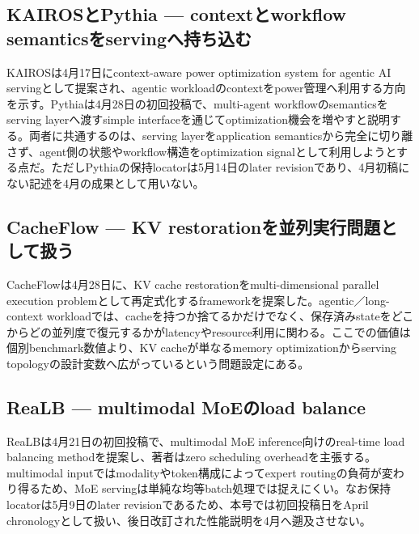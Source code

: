 \begingroup\raggedright
\subsection{KAIROSとPythia — contextとworkflow semanticsをservingへ持ち込む}
\par\endgroup

KAIROSは4月17日にcontext-aware power optimization system for agentic AI servingとして提案され、agentic workloadのcontextをpower管理へ利用する方向を示す。Pythiaは4月28日の初回投稿で、multi-agent workflowのsemanticsをserving layerへ渡すsimple interfaceを通じてoptimization機会を増やすと説明する。両者に共通するのは、serving layerをapplication semanticsから完全に切り離さず、agent側の状態やworkflow構造をoptimization signalとして利用しようとする点だ。ただしPythiaの保持locatorは5月14日のlater revisionであり、4月初稿にない記述を4月の成果として用いない。\autocite{src-551442a9e215,src-d91793d0a6fa}


\begingroup\raggedright
\subsection{CacheFlow — KV restorationを並列実行問題として扱う}
\par\endgroup

CacheFlowは4月28日に、KV cache restorationをmulti-dimensional parallel execution problemとして再定式化するframeworkを提案した。agentic／long-context workloadでは、cacheを持つか捨てるかだけでなく、保存済みstateをどこからどの並列度で復元するかがlatencyやresource利用に関わる。ここでの価値は個別benchmark数値より、KV cacheが単なるmemory optimizationからserving topologyの設計変数へ広がっているという問題設定にある。\autocite{src-0fc9d11483aa}


\begingroup\raggedright
\subsection{ReaLB — multimodal MoEのload balance}
\par\endgroup

ReaLBは4月21日の初回投稿で、multimodal MoE inference向けのreal-time load balancing methodを提案し、著者はzero scheduling overheadを主張する。multimodal inputではmodalityやtoken構成によってexpert routingの負荷が変わり得るため、MoE servingは単純な均等batch処理では捉えにくい。なお保持locatorは5月9日のlater revisionであるため、本号では初回投稿日をApril chronologyとして扱い、後日改訂された性能説明を4月へ遡及させない。\autocite{src-2a6eae37bd39}


